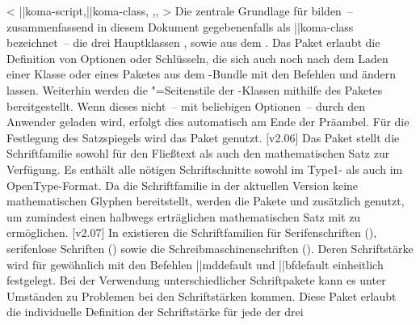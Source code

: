\begin{DeclarePackages}
<%
    \Bundle||{koma-script},\Class||{koma-class},%
    ,,%
  >%
  Die zentrale Grundlage für \TUDScript bilden~-- zusammenfassend in diesem 
  Dokument gegebenenfalls als \Class||{koma-class} bezeichnet~-- die drei 
  Hauptklassen ,  sowie  aus dem 
  . Das Paket  erlaubt die 
  Definition von Optionen oder Schlüsseln, die sich auch noch nach dem Laden 
  einer Klasse oder eines Paketes aus dem \TUDScript-Bundle mit den Befehlen 
   und  ändern lassen. Weiterhin werden die 
  "=Seitenstile der \TUDScript-Klassen mithilfe des 
  Paketes  bereitgestellt. Wenn dieses nicht~-- mit 
  beliebigen Optionen~-- durch den Anwender geladen wird, erfolgt dies 
  automatisch am Ende der Präambel. Für die Festlegung des Satzspiegels wird
  das Paket  genutzt.
[v2.06]
  Das Paket  stellt die Schriftfamilie \OpenSans sowohl für 
  den Fließtext als auch den mathematischen Satz zur Verfügung. Es enthält alle 
  nötigen Schriftschnitte sowohl im Type1- als auch im OpenType-Format. Da die 
  Schriftfamilie in der aktuellen Version keine mathematischen Glyphen 
  bereitstellt, werden die Pakete  und  
  zusätzlich genutzt, um zumindest einen halbwegs erträglichen mathematischen 
  Satz mit \OpenSans zu ermöglichen.
  [v2.07]
  In  existieren die Schriftfamilien für Serifenschriften 
  (), serifenlose Schriften () sowie die 
  Schreibmaschinenschriften (). Deren Schriftstärke wird für 
  gewöhnlich mit den Befehlen \Macro||{mddefault} und \Macro||{bfdefault} 
  einheitlich festgelegt. Bei der Verwendung unterschiedlicher Schriftpakete 
  kann es unter Umständen zu Problemen bei den Schriftstärken kommen. Diese 
  Paket erlaubt die individuelle Definition der Schriftstärke für jede der drei 

\end{DeclarePackages}
